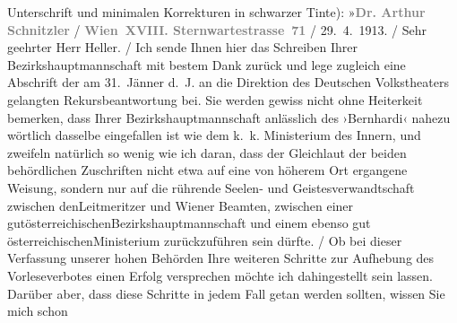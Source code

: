 {{{                  Unterschrift und minimalen Korrekturen in schwarzer Tinte): »\textcolor{gray}{\textbf{Dr. Arthur Schnitzler}}{ / }\textcolor{gray}{\textbf{Wien XVIII. Sternwartestrasse 71}}{ / }29. 4. 1913.{ / }Sehr geehrter Herr Heller.{ / }Ich sende Ihnen hier das Schreiben Ihrer Bezirkshauptmannschaft mit bestem Dank zurück und
                        lege zugleich eine Abschrift der am 31. Jänner d. J. an die
                        Direktion des Deutschen Volkstheaters
                        gelangten Rekursbeantwortung bei. Sie werden gewiss nicht ohne Heiterkeit
                        bemerken, dass Ihrer Bezirkshauptmannschaft anlässlich des ›Bernhardi‹ nahezu wörtlich dasselbe eingefallen ist
                        wie dem k. k. Ministerium des Innern,
                        und zweifeln natürlich so wenig wie ich daran, dass der Gleichlaut der
                        beiden behördlichen Zuschriften nicht etwa auf eine von höherem Ort
                        ergangene Weisung, sondern nur auf die rührende Seelen- und
                        Geistesverwandtschaft zwischen denLeitmeritzer und Wiener Beamten,
                        zwischen einer gutösterreichischenBezirkshauptmannschaft und einem ebenso gut österreichischenMinisterium
                        zurückzuführen sein dürfte.{ / }Ob bei dieser Verfassung unserer hohen
                        Behörden Ihre weiteren Schritte zur Aufhebung des Vorleseverbotes einen
                        Erfolg versprechen möchte ich dahingestellt sein lassen. Darüber aber, dass
                        diese Schritte in jedem Fall getan werden sollten, wissen Sie mich schon
}}}
